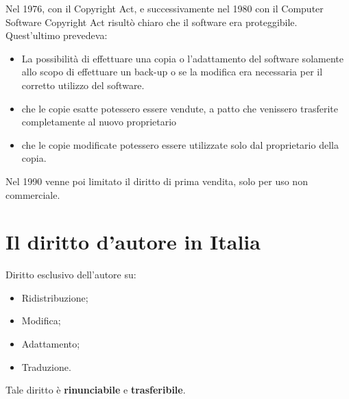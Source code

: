 Nel 1976, con il Copyright Act, e successivamente nel 1980 con il Computer Software Copyright Act risultò chiaro che il software era proteggibile. Quest'ultimo prevedeva:

\begin{itemize}
	\item La possibilità di effettuare una copia o l'adattamento del software solamente allo scopo di effettuare un back-up o se la modifica era necessaria per il corretto utilizzo del software.
	\item che le copie esatte potessero essere vendute, a patto che venissero trasferite completamente al nuovo proprietario
	\item che le copie modificate potessero essere utilizzate solo dal proprietario della copia.
\end{itemize}

Nel 1990 venne poi limitato il diritto di prima vendita, solo per uso non commerciale.

\section{Il diritto d'autore in Italia}

Diritto esclusivo dell'autore su:

\begin{itemize}

\item Ridistribuzione;
\item Modifica;
\item Adattamento;
\item Traduzione.

\end{itemize}

Tale diritto è \textbf{rinunciabile} e \textbf{trasferibile}.
